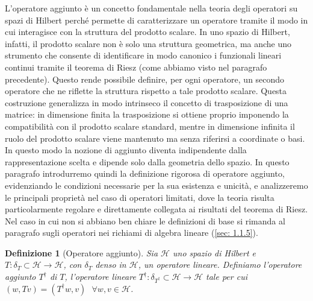 \documentclass[a4paper,12pt]{report}
\newtheorem{definizione}{Definizione}[chapter]
\begin{document}
L’operatore aggiunto è un concetto fondamentale nella teoria degli operatori su spazi di Hilbert perché permette di caratterizzare un operatore tramite il modo in cui interagisce con la struttura del prodotto scalare. In uno spazio di Hilbert, infatti, il prodotto scalare non è solo una struttura geometrica, ma anche uno strumento che consente di identificare in modo canonico i funzionali lineari continui tramite il teorema di Riesz (come abbiamo visto nel paragrafo precedente). Questo rende possibile definire, per ogni operatore, un secondo operatore che ne riflette la struttura rispetto a tale prodotto scalare.
Questa costruzione generalizza in modo intrinseco il concetto di trasposizione di una matrice: in dimensione finita la trasposizione si ottiene proprio imponendo la compatibilità con il prodotto scalare standard, mentre in dimensione infinita il ruolo del prodotto scalare viene mantenuto ma senza riferirsi a coordinate o basi. In questo modo la nozione di aggiunto diventa indipendente dalla rappresentazione scelta e dipende solo dalla geometria dello spazio.
In questo paragrafo introdurremo quindi la definizione rigorosa di operatore aggiunto, evidenziando le condizioni necessarie per la sua esistenza e unicità, e analizzeremo le principali proprietà nel caso di operatori limitati, dove la teoria risulta particolarmente regolare e direttamente collegata ai risultati del teorema di Riesz. Nel caso in cui non si abbiano ben chiare le definizioni di base si rimanda al paragrafo sugli operatori nei richiami di algebra lineare (\ref{sec: 1.1.5}).

\begin{definizione}[Operatore aggiunto]\label{def: 5.8}
    Sia $\mathscr{H}$ uno spazio di Hilbert e $T: \delta_T\subset \mathscr{H}\to \mathscr{H}$, con $\delta_T $ denso in $\mathscr{H}$, un operatore lineare. Definiamo l'operatore aggiunto $T^{\dagger}$ di $T$, l'operatore lineare 
    $T^\dagger :\delta_{T^\dagger}\subset \mathscr{H}\to \mathscr{H}$ tale per cui $(w,Tv)=(T^\dagger w,v) \ \ \ \forall w,v\in \mathscr{H}$.
\end{definizione}
\end{document}
